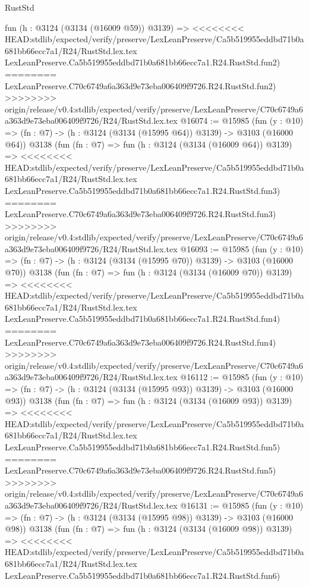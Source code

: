 \begin{lexlean}{RustStd}
\begin{coremodule}
{\begin{coremodule}
{{{{{{{{{{{{{{{{{{{{{{{{{{    fun (h : @3124 (@3134 (@16009 @59)) @3139) =>
<<<<<<<< HEAD:stdlib/expected/verify/preserve/LexLeanPreserve/Ca5b519955eddbd71b0a681bb66ecc7a1/R24/RustStd.lex.tex
    LexLeanPreserve.Ca5b519955eddbd71b0a681bb66ecc7a1.R24.RustStd.fun2)
========
    LexLeanPreserve.C70c6749a6a363d9e73eba006409f9726.R24.RustStd.fun2)
>>>>>>>> origin/release/v0.4:stdlib/expected/verify/preserve/LexLeanPreserve/C70c6749a6a363d9e73eba006409f9726/R24/RustStd.lex.tex
@16074 := @15985
    (fun (y : @10) => (fn : @7) -> (h : @3124 (@3134 (@15995 @64)) @3139) -> @3103 (@16000 @64))
    @3138
    (fun (fn : @7) =>
    fun (h : @3124 (@3134 (@16009 @64)) @3139) =>
<<<<<<<< HEAD:stdlib/expected/verify/preserve/LexLeanPreserve/Ca5b519955eddbd71b0a681bb66ecc7a1/R24/RustStd.lex.tex
    LexLeanPreserve.Ca5b519955eddbd71b0a681bb66ecc7a1.R24.RustStd.fun3)
========
    LexLeanPreserve.C70c6749a6a363d9e73eba006409f9726.R24.RustStd.fun3)
>>>>>>>> origin/release/v0.4:stdlib/expected/verify/preserve/LexLeanPreserve/C70c6749a6a363d9e73eba006409f9726/R24/RustStd.lex.tex
@16093 := @15985
    (fun (y : @10) => (fn : @7) -> (h : @3124 (@3134 (@15995 @70)) @3139) -> @3103 (@16000 @70))
    @3138
    (fun (fn : @7) =>
    fun (h : @3124 (@3134 (@16009 @70)) @3139) =>
<<<<<<<< HEAD:stdlib/expected/verify/preserve/LexLeanPreserve/Ca5b519955eddbd71b0a681bb66ecc7a1/R24/RustStd.lex.tex
    LexLeanPreserve.Ca5b519955eddbd71b0a681bb66ecc7a1.R24.RustStd.fun4)
========
    LexLeanPreserve.C70c6749a6a363d9e73eba006409f9726.R24.RustStd.fun4)
>>>>>>>> origin/release/v0.4:stdlib/expected/verify/preserve/LexLeanPreserve/C70c6749a6a363d9e73eba006409f9726/R24/RustStd.lex.tex
@16112 := @15985
    (fun (y : @10) => (fn : @7) -> (h : @3124 (@3134 (@15995 @93)) @3139) -> @3103 (@16000 @93))
    @3138
    (fun (fn : @7) =>
    fun (h : @3124 (@3134 (@16009 @93)) @3139) =>
<<<<<<<< HEAD:stdlib/expected/verify/preserve/LexLeanPreserve/Ca5b519955eddbd71b0a681bb66ecc7a1/R24/RustStd.lex.tex
    LexLeanPreserve.Ca5b519955eddbd71b0a681bb66ecc7a1.R24.RustStd.fun5)
========
    LexLeanPreserve.C70c6749a6a363d9e73eba006409f9726.R24.RustStd.fun5)
>>>>>>>> origin/release/v0.4:stdlib/expected/verify/preserve/LexLeanPreserve/C70c6749a6a363d9e73eba006409f9726/R24/RustStd.lex.tex
@16131 := @15985
    (fun (y : @10) => (fn : @7) -> (h : @3124 (@3134 (@15995 @98)) @3139) -> @3103 (@16000 @98))
    @3138
    (fun (fn : @7) =>
    fun (h : @3124 (@3134 (@16009 @98)) @3139) =>
<<<<<<<< HEAD:stdlib/expected/verify/preserve/LexLeanPreserve/Ca5b519955eddbd71b0a681bb66ecc7a1/R24/RustStd.lex.tex
    LexLeanPreserve.Ca5b519955eddbd71b0a681bb66ecc7a1.R24.RustStd.fun6)
}}}}}}}}}}}}}}}}}}}}}}}}}}
\end{coremodule}}
\end{coremodule}
\end{lexlean}
